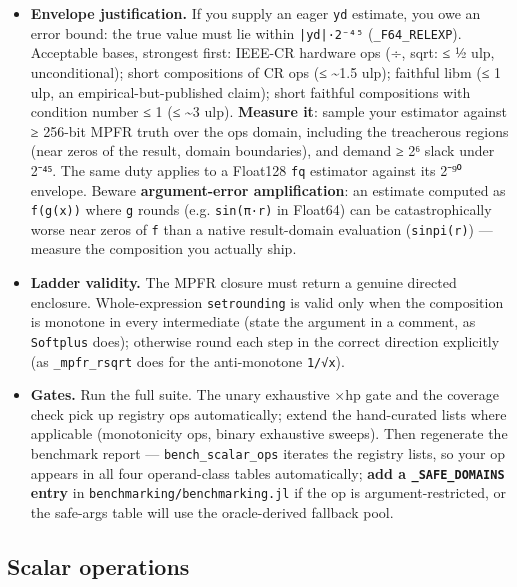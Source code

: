 \begin{itemize}
\item[4. ] \textbf{Envelope justification.} If you supply an eager \texttt{yd} estimate, you owe an error bound: the true value must lie within \texttt{|yd|·2⁻⁴⁵} (\texttt{\_\allowbreak{}F64\_\allowbreak{}RELEXP}). Acceptable bases, strongest first: IEEE-CR hardware ops (÷, sqrt: ≤ ½ ulp, unconditional); short compositions of CR ops (≤ {\textasciitilde}1.5 ulp); faithful libm (≤ 1 ulp, an empirical-but-published claim); short faithful compositions with condition number ≤ 1 (≤ {\textasciitilde}3 ulp). \textbf{Measure it}: sample your estimator against ≥ 256-bit MPFR truth over the op{\textquotesingle}s domain, including the treacherous regions (near zeros of the result, domain boundaries), and demand ≥ 2⁶ slack under 2⁻⁴⁵. The same duty applies to a Float128 \texttt{fq} estimator against its 2⁻⁹⁰ envelope. Beware \textbf{argument-error amplification}: an estimate computed as \texttt{f(g(x))} where \texttt{g} rounds (e.g. \texttt{sin(π·r)} in Float64) can be catastrophically worse near zeros of \texttt{f} than a native result-domain evaluation (\texttt{sinpi(r)}) — measure the composition you actually ship.


\item[5. ] \textbf{Ladder validity.} The MPFR closure must return a genuine directed enclosure. Whole-expression \texttt{setrounding} is valid only when the composition is monotone in every intermediate (state the argument in a comment, as \texttt{Softplus} does); otherwise round each step in the correct direction explicitly (as \texttt{\_\allowbreak{}mpfr\_\allowbreak{}rsqrt} does for the anti-monotone \texttt{1/√x}).


\item[6. ] \textbf{Gates.} Run the full suite. The unary exhaustive ×hp gate and the coverage check pick up registry ops automatically; extend the hand-curated lists where applicable (monotonicity ops, binary exhaustive sweeps). Then regenerate the benchmark report — \texttt{bench\_\allowbreak{}scalar\_\allowbreak{}ops} iterates the registry lists, so your op appears in all four operand-class tables automatically; \textbf{add a \texttt{\_\allowbreak{}SAFE\_\allowbreak{}DOMAINS} entry} in \texttt{benchmarking/\allowbreak{}benchmarking.jl} if the op is argument-restricted, or the safe-args table will use the oracle-derived fallback pool.

\end{itemize}


\subsection{Scalar operations}



